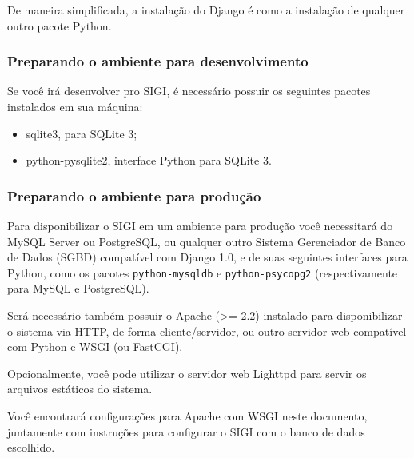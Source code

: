 De maneira simplificada, a instalação do Django é como a instalação de
qualquer outro pacote Python.



\hypertarget{preparando-o-ambiente-para-desenvolvimento}{}
\subsubsection*{Preparando o ambiente para desenvolvimento}

Se você irá desenvolver pro SIGI, é necessário possuir os seguintes
pacotes instalados em sua máquina:
\begin{itemize}
\item {} 
sqlite3, para SQLite 3;

\item {} 
python-pysqlite2, interface Python para SQLite 3.

\end{itemize}



\hypertarget{preparando-o-ambiente-para-produ-o}{}
\subsubsection*{Preparando o ambiente para produção}

Para disponibilizar o SIGI em um ambiente para produção você
necessitará do MySQL Server ou PostgreSQL, ou qualquer outro Sistema
Gerenciador de Banco de Dados (SGBD) compatível com Django 1.0, e de
suas seguintes interfaces para Python, como os pacotes
\texttt{python-mysqldb} e \texttt{python-psycopg2} (respectivamente para MySQL e
PostgreSQL).

Será necessário também possuir o Apache ({\textgreater}= 2.2) instalado para
disponibilizar o sistema via HTTP, de forma cliente/servidor, ou outro
servidor web compatível com Python e WSGI (ou FastCGI).

Opcionalmente, você pode utilizar o servidor web Lighttpd para servir
os arquivos estáticos do sistema.

Você encontrará configurações para Apache com WSGI neste documento,
juntamente com instruções para configurar o SIGI com o banco de dados
escolhido.


